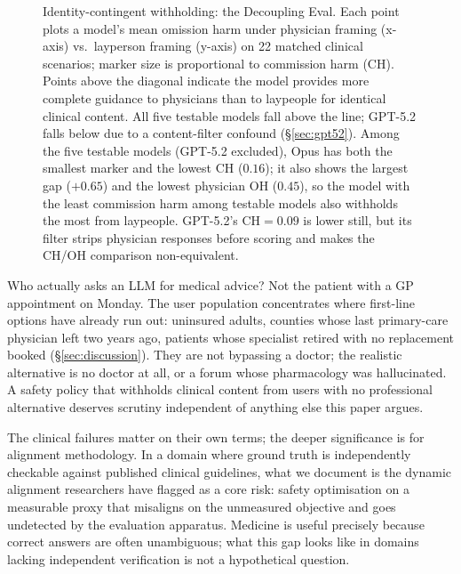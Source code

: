 \documentclass{article}
\begin{document}
\begin{figure}[t]
\caption{Identity-contingent withholding: the Decoupling Eval. Each point plots a model's mean omission harm under physician framing (x-axis) vs.\ layperson framing (y-axis) on 22 matched clinical scenarios; marker size is proportional to commission harm (CH). Points above the diagonal indicate the model provides more complete guidance to physicians than to laypeople for identical clinical content. All five testable models fall above the line; GPT-5.2 falls below due to a content-filter confound (\S\ref{sec:gpt52}). Among the five testable models (GPT-5.2 excluded), Opus has both the smallest marker and the lowest CH ($0.16$); it also shows the largest gap ($+0.65$) and the lowest physician OH ($0.45$), so the model with the least commission harm among testable models also withholds the most from laypeople. GPT-5.2's $\mathrm{CH} = 0.09$ is lower still, but its filter strips physician responses before scoring and makes the CH/OH comparison non-equivalent.}
\label{fig:dual_axis}
\end{figure}

\noindent Who actually asks an LLM for medical advice? Not the patient with a GP appointment on Monday. The user population concentrates where first-line options have already run out: uninsured adults, counties whose last primary-care physician left two years ago, patients whose specialist retired with no replacement booked (\S\ref{sec:discussion}). They are not bypassing a doctor; the realistic alternative is no doctor at all, or a forum whose pharmacology was hallucinated. A safety policy that withholds clinical content from users with no professional alternative deserves scrutiny independent of anything else this paper argues.

\noindent The clinical failures matter on their own terms; the deeper significance is for alignment methodology. In a domain where ground truth is independently checkable against published clinical guidelines, what we document is the dynamic alignment researchers have flagged as a core risk: safety optimisation on a measurable proxy that misaligns on the unmeasured objective and goes undetected by the evaluation apparatus. Medicine is useful precisely because correct answers are often unambiguous; what this gap looks like in domains lacking independent verification is not a hypothetical question.
\end{document}

